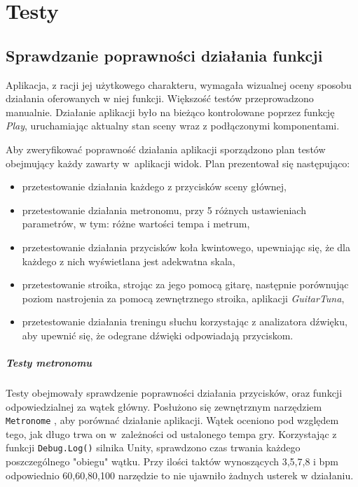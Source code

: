 \chapter{Testy}

\section{Sprawdzanie poprawności działania funkcji}

Aplikacja, z racji jej użytkowego charakteru, wymagała wizualnej oceny sposobu działania oferowanych w niej funkcji. Większość testów przeprowadzono manualnie. Działanie aplikacji było na bieżąco kontrolowane poprzez funkcję \emph{Play}, uruchamiając aktualny stan sceny wraz z podłączonymi komponentami.

Aby zweryfikować poprawność działania aplikacji sporządzono plan testów obejmujący każdy zawarty w~aplikacji widok. Plan prezentował się następująco:
\begin{itemize}
    \item przetestowanie działania każdego z przycisków sceny głównej,
    \item przetestowanie działania metronomu, przy 5 różnych ustawieniach parametrów, w tym: różne wartości tempa i metrum,
    \item przetestowanie działania przycisków koła kwintowego, upewniając się, że dla każdego z nich wyświetlana jest adekwatna skala,
    \item przetestowanie stroika, strojąc za jego pomocą gitarę, następnie porównując poziom nastrojenia za pomocą zewnętrznego stroika, aplikacji \emph{GuitarTuna},
    \item przetestowanie działania treningu słuchu korzystając z analizatora dźwięku, aby upewnić się, że odegrane dźwięki odpowiadają przyciskom.
\end{itemize} 

\paragraph{Testy metronomu}

Testy obejmowały sprawdzenie poprawności działania przycisków, oraz funkcji odpowiedzialnej za wątek główny. Posłużono się zewnętrznym narzędziem \texttt{Metronome} \cite{Musicca}, aby porównać działanie aplikacji. Wątek oceniono pod względem tego, jak długo trwa on w~zależności od ustalonego tempa gry. Korzystając z funkcji \texttt{Debug.Log()} silnika Unity, sprawdzono czas trwania każdego poszczególnego "obiegu" wątku. Przy ilości taktów wynoszących 3,5,7,8 i bpm odpowiednio 60,60,80,100 narzędzie to nie ujawniło żadnych usterek w działaniu.

